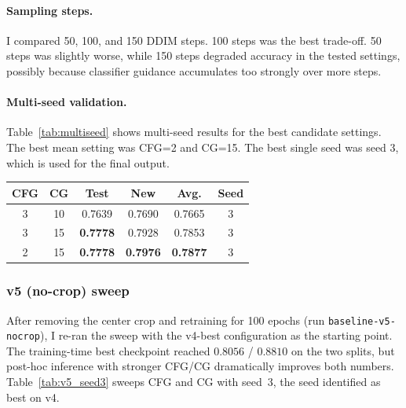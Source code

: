 \documentclass[10pt,twocolumn,letterpaper]{article}
\begin{document}
\paragraph{Sampling steps.}
I compared 50, 100, and 150 DDIM steps. 100 steps was the best trade-off. 50 steps was slightly worse, while 150 steps degraded accuracy in the tested settings, possibly because classifier guidance accumulates too strongly over more steps.

\paragraph{Multi-seed validation.}
Table~\ref{tab:multiseed} shows multi-seed results for the best candidate settings. The best mean setting was CFG=2 and CG=15. The best single seed was seed 3, which is used for the final output.

\begin{center}
\small
\setlength{\tabcolsep}{3pt}
\begin{tabular}{cccccc}
\toprule
CFG & CG & Test & New & Avg. & Seed \\
\midrule
3 & 10 & 0.7639 & 0.7690 & 0.7665 & 3 \\
3 & 15 & \cellcolor{yellow!25}\textbf{0.7778} & 0.7928 & 0.7853 & 3 \\
2 & 15 & \cellcolor{yellow!25}\textbf{0.7778} & \cellcolor{yellow!25}\textbf{0.7976} & \cellcolor{yellow!25}\textbf{0.7877} & 3 \\
\bottomrule
\end{tabular}
\label{tab:multiseed}
\end{center}

\subsubsection{v5 (no-crop) sweep}
\label{sec:v5_ablation}

After removing the center crop and retraining for 100 epochs (run \texttt{baseline-v5-nocrop}), I re-ran the sweep with the v4-best configuration as the starting point. The training-time best checkpoint reached $0.8056$ / $0.8810$ on the two splits, but post-hoc inference with stronger CFG/CG dramatically improves both numbers. Table~\ref{tab:v5_seed3} sweeps CFG and CG with seed~3, the seed identified as best on v4.
\end{document}
